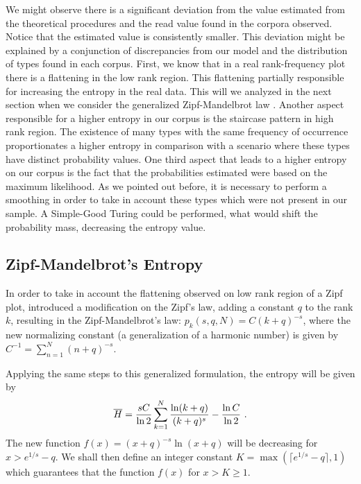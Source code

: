 We might observe there is a significant deviation from the value estimated from the theoretical
procedures and the read value found in the corpora observed. Notice that the estimated value is consistently 
smaller. This deviation might be explained by a conjunction of discrepancies from our model and
the distribution of types found in each corpus. First, we know that in a real rank-frequency plot
there is a flattening in the low rank region. This flattening partially responsible for increasing
the entropy in the real data. This will we analyzed in the next section when we consider the 
generalized Zipf-Mandelbrot law \citep{mandelbrot1965}. Another aspect responsible for a higher 
entropy in our corpus is the staircase pattern in high rank region. The existence of many types
with the same frequency of occurrence proportionates a higher entropy in comparison with
a scenario where these types have distinct probability values. One third aspect that leads to
a higher entropy on our corpus is the fact that the probabilities estimated were based on
the maximum likelihood. As we pointed out before, it is necessary to perform a smoothing
in order to take in account these types which were not present in our sample. 
A Simple-Good Turing \citep{galesampson95} could be performed, what would  
shift the probability mass, decreasing the entropy value.



\subsection{Zipf-Mandelbrot's Entropy}
In order to take in account the flattening observed on low rank region of a Zipf plot, \cite{mandelbrot1965}
introduced a modification on the Zipf's law, adding a constant $q$ to the rank $k$, resulting in the Zipf-Mandelbrot's
law: $p_k(s,q,N) = C(k+q)^{-s}$, where the new normalizing constant (a generalization of a harmonic number)
is given by $C^{-1}=\sum_{n=1}^{N}(n+q)^{-s}$.

Applying the same steps to this generalized formulation, the entropy will be given by
\begin{equation}
\label{eq:ent_zipfmand_source}
\overline{H} = \frac{sC}{\ln 2} \sum_{k=1}^N \frac{\ln (k+q)}{(k+q)^s} - \frac{\ln C}{\ln 2} \textmd{ .}
\end{equation}
The new function $f(x)=(x+q)^{-s} \ln (x+q)$ will be decreasing for $x>e^{1/s}-q$. 
We shall then define an integer constant $K = \max(\lceil e^{1/s}-q \rceil,1)$ which guarantees that
the function $f(x)$ for $x>K \geq 1$.

